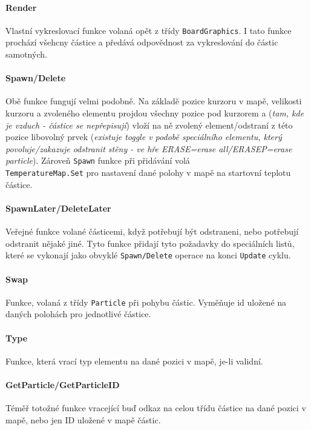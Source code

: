 \documentclass[a4paper, 12pt]{article}
\begin{document}
\paragraph{Render}
Vlastní vykreslovací funkce volaná opět z třídy \texttt{BoardGraphics}. I tato
funkce prochází všehcny částice a předává odpovědnost za vykreslování do částic
samotných.

\paragraph{Spawn/Delete}
Obě funkce fungují velmi podobně. Na základě pozice kurzoru v mapě, velikosti
kurzoru a zvoleného elementu projdou všechny pozice pod kurzorem a (\emph{tam,
kde je vzduch - částice se nepřepisují}) vloží na ně zvolený element/odstraní z
této pozice libovolný prvek (\emph{existuje toggle v podobě speciálního
elementu, který povoluje/zakazuje odstranit stěny - ve hře ERASE=erase
all/ERASEP=erase particle}). Zároveň \texttt{Spawn} funkce při přidávání volá
\\\texttt{TemperatureMap.Set} pro nastavení dané polohy v mapě na startovní
teplotu částice.

\paragraph{SpawnLater/DeleteLater}
Veřejné funkce volané částicemi, když potřebují být odstraneni, nebo potřebují
odstranit nějaké jiné. Tyto funkce přidají tyto požadavky do speciálních listů,
které se vykonají jako obvyklé \texttt{Spawn/Delete} operace na konci 
\texttt{Update} cyklu.

\paragraph{Swap}
Funkce, volaná z třídy \texttt{Particle} při pohybu částic. Vyměňuje id uložené
na daných polohách pro jednotlivé částice.

\paragraph{Type}
Funkce, která vrací typ elementu na dané pozici v mapě, je-li validní.

\paragraph{GetParticle/GetParticleID}
Téměř totožné funkce vracející buď odkaz na celou třídu částice na dané pozici
v mapě, nebo jen ID uložené v mapě částic.
\end{document}
